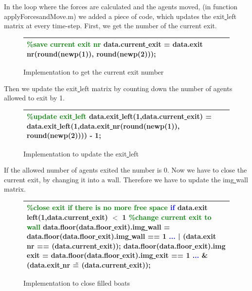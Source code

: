 \documentclass[11pt]{article}
\begin{document}
\bigskip
In the loop where the forces are calculated and the agents moved, (in function applyForcesandMove.m) we added a piece of code, which updates the exit\underline{ }left matrix at every time-step.
\newline
First, we get the number of the current exit.

\begin{figure}[h!]
\centering
\begin{tabular}
{|>{\large}m{\textwidth}|} \hline
\bigskip
\textcolor{green}{\%save current exit nr}
\newline
data.current\underline{ }exit = data.exit\underline{ }nr(round(newp(1)), round(newp(2)));
\bigskip
\\ \hline
\end{tabular}
\caption{Implementation to get the current exit number}
\end{figure}

Then we update the exit\underline{ }left matrix by counting down the number of agents allowed to exit by 1. 

\begin{figure}[h!]
\centering
\begin{tabular}
{|>{\large}m{\textwidth}|} \hline
\bigskip
\textcolor{green}{\%update exit\underline{ }left}
\newline
data.exit\underline{ }left(1,data.current\underline{ }exit) = data.exit\underline{ }left(1,data.exit\underline{ }nr(round(newp(1)), round(newp(2)))) - 1;
\bigskip
\\ \hline
\end{tabular}
\caption{Implementation to update the exit\underline{ }left}
\end{figure}

If the allowed number of agents exited the number is 0. Now we have to close the current exit, by changing it into a wall. Therefore we have to update the img\underline{ }wall matrix.

\begin{figure}[h!]
\centering
\begin{tabular}
{|>{\large}m{\textwidth}|} \hline
\bigskip
\textcolor{green}{\%close exit if there is no more free space}
\newline
\textcolor{blue}{if} data.exit\underline{ } left(1,data.current\underline{ }exit) $<$ 1
\newline
\textcolor{green}{\%change current exit to wall}
\newline
data.floor(data.floor\underline{ }exit).img\underline{ }wall = data.floor(data.floor\underline{ }exit).img\underline{ }wall == 1 \textcolor{blue}{...}
\newline
| (data.exit\underline{ }nr == (data.current\underline{ }exit));
\newline
data.floor(data.floor\underline{ }exit).img\underline{ }exit = data.floor(data.floor\underline{ }exit).img\underline{ }exit == 1 \textcolor{blue}{...}
\newline
\& (data.exit\underline{ }nr \~ = (data.current\underline{ }exit));
\bigskip
\\ \hline
\end{tabular}
\caption{Implementation to close filled  boats}
\end{figure}
\newpage
\end{document}
